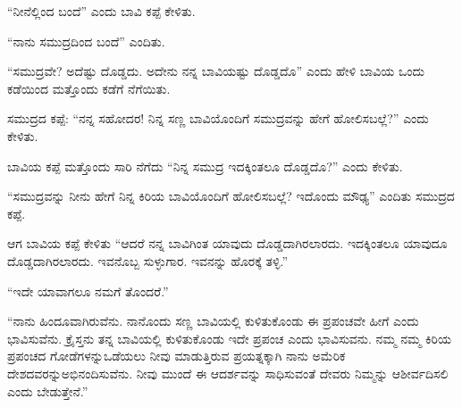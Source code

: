 \vskip 5pt

“ನೀನೆಲ್ಲಿಂದ ಬಂದೆ” ಎಂದು ಬಾವಿ ಕಪ್ಪೆ ಕೇಳಿತು.

\vskip 5pt

“ನಾನು ಸಮುದ್ರದಿಂದ ಬಂದೆ” ಎಂದಿತು.

\vskip 5pt

“ಸಮುದ್ರವೇ? ಅದೆಷ್ಟು ದೊಡ್ಡದು. ಅದೇನು ನನ್ನ ಬಾವಿಯಷ್ಟು ದೊಡ್ಡದೊ” ಎಂದು ಹೇಳಿ ಬಾವಿಯ ಒಂದು ಕಡೆಯಿಂದ ಮತ್ತೊಂದು ಕಡೆಗೆ ನೆಗೆಯಿತು.

\vskip 5pt

ಸಮುದ್ರದ ಕಪ್ಪೆ: “ನನ್ನ ಸಹೋದರ! ನಿನ್ನ ಸಣ್ಣ ಬಾವಿಯೊಂದಿಗೆ ಸಮುದ್ರವನ್ನು ಹೇಗೆ ಹೋಲಿಸಬಲ್ಲೆ?” ಎಂದು ಕೇಳಿತು.

\vskip 5pt

ಬಾವಿಯ ಕಪ್ಪೆ ಮತ್ತೊಂದು ಸಾರಿ ನೆಗೆದು “ನಿನ್ನ ಸಮುದ್ರ ಇದಕ್ಕಿಂತಲೂ ದೊಡ್ಡದೊ?” ಎಂದು ಕೇಳಿತು.

\vskip 5pt

“ಸಮುದ್ರವನ್ನು ನೀನು ಹೇಗೆ ನಿನ್ನ ಕಿರಿಯ ಬಾವಿಯೊಂದಿಗೆ ಹೋಲಿಸಬಲ್ಲೆ? ಇದೊಂದು ಮೌಢ್ಯ” ಎಂದಿತು ಸಮುದ್ರದ ಕಪ್ಪೆ.

\vskip 5pt

ಆಗ ಬಾವಿಯ ಕಪ್ಪೆ ಕೇಳಿತು “ಆದರೆ ನನ್ನ ಬಾವಿಗಿಂತ ಯಾವುದು ದೊಡ್ಡದಾಗಿರಲಾರದು. ಇದಕ್ಕಿಂತಲೂ ಯಾವುದೂ ದೊಡ್ಡದಾಗಿರಲಾರದು. ಇವನೊಬ್ಬ ಸುಳ್ಳುಗಾರ. ಇವನನ್ನು ಹೊರಕ್ಕೆ ತಳ್ಳಿ.”

\vskip 5pt

“ಇದೇ ಯಾವಾಗಲೂ ನಮಗೆ ತೊಂದರೆ.”

\vskip 5pt

“ನಾನು ಹಿಂದೂವಾಗಿರುವೆನು. ನಾನೊಂದು ಸಣ್ಣ ಬಾವಿಯಲ್ಲಿ ಕುಳಿತುಕೊಂಡು ಈ ಪ್ರಪಂಚವೇ ಹೀಗೆ ಎಂದು ಭಾವಿಸುವೆನು. ಕ್ರೈಸ್ತನು ತನ್ನ ಬಾವಿಯಲ್ಲಿ ಕುಳಿತುಕೊಂಡು ಇದೇ ಪ್ರಪಂಚ ಎಂದು ಭಾವಿಸುವನು. ನಮ್ಮ ನಮ್ಮ ಕಿರಿಯ ಪ್ರಪಂಚದ ಗೋಡೆಗಳನ್ನು\break ಒಡೆಯಲು ನೀವು ಮಾಡುತ್ತಿರುವ ಪ್ರಯತ್ನಕ್ಕಾಗಿ ನಾನು ಅಮೆರಿಕ ದೇಶದವರನ್ನು\break ಅಭಿನಂದಿಸುವೆನು. ನೀವು ಮುಂದೆ ಈ ಆದರ್ಶವನ್ನು ಸಾಧಿಸುವಂತೆ ದೇವರು ನಿಮ್ಮನ್ನು ಆಶೀರ್ವದಿಸಲಿ ಎಂದು ಬೇಡುತ್ತೇನೆ.”


